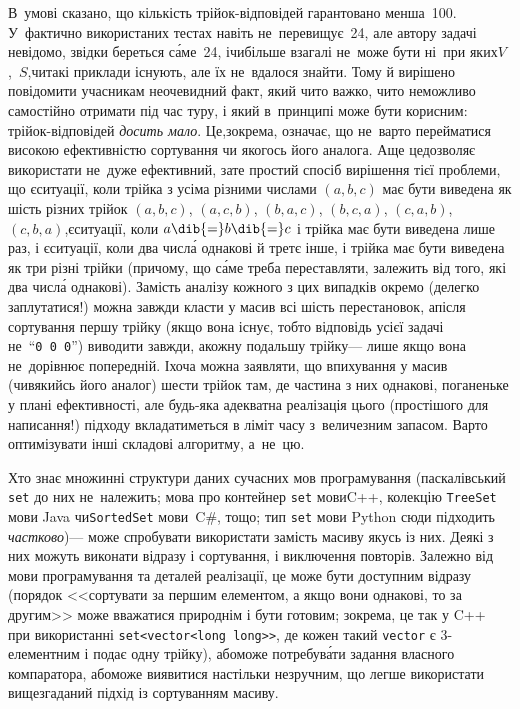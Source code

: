 В~умові сказано, що кількість трійок-відповідей гарантовано менша~100. У~фактично використаних тестах навіть не~перевищує~24, але автору задачі невідомо, звідки береться с\'{а}ме~24, і\nolinebreak[2] чи\nolinebreak[2] більше взагалі не~може бути ні~при яких\nolinebreak[3] $V$,~$S$,\linebreak[2] чи\nolinebreak[3] такі приклади існують, але їх не~вдалося знайти. Тому й вирішено повідомити учасникам неочевидний факт, який чи\nolinebreak[3] то важко, чи\nolinebreak[3] то неможливо самостійно отримати під час туру, і який в~принципі може бути корисним: трійок-відповідей \emph{досить мало}.
Це,\nolinebreak[3] зокрема, означає, що не~варто перейматися високою ефективністю сортування чи якогось його аналога. А\nolinebreak[2] ще це\nolinebreak[2] дозволяє використати не~дуже ефективний, зате простий спосіб вирішення тієї проблеми, що є\nolinebreak[2] ситуації, коли трійка з усіма різними числами $(a,b,c)$ має бути виведена як шість різних трійок $(a,b,c)$,
$(a,c,b)$,
$(b,a,c)$,
$(b,c,a)$,
$(c,a,b)$,
$(c,b,a)$,\linebreak[2] 
є\nolinebreak[2] ситуації, коли $a\dib{{=}}b\dib{{=}}c$ і трійка має бути виведена лише раз,
і є\nolinebreak[2] ситуації, коли два числ\'{а} однакові й третє інше, і трійка має бути виведена як три різні трійки (причому, що с\'{а}ме треба переставляти, залежить від того, які два числ\'{а} однакові). Замість аналізу кожного з цих випадків окремо (де\nolinebreak[3] легко заплутатися!) можна завжди класти у масив всі шість перестановок, а\nolinebreak[3] після сортування першу трійку (якщо вона існує, тобто відповідь усієї задачі не~``\texttt{0~0~0}'') виводити завжди, а\nolinebreak[3] кожну подальшу трійку\nolinebreak[3] --- лише якщо вона не~дорівнює попередній. І\nolinebreak[3] хоча можна заявляти, що впихування у масив (чи\nolinebreak[3] в\nolinebreak[3] якийсь його аналог) шести трійок там, де частина з них однакові, поганеньке у плані ефективності, але будь-яка адекватна реалізація цього (простішого для написання!) підходу вкладатиметься в ліміт часу з~величезним запасом. Варто оптимізувати інші складові алгоритму, а~не~цю.

Хто знає множинні структури даних сучасних мов програмування (паскалівський \texttt{set} до них не~належить; мова про контейнер \texttt{set} мови\nolinebreak[3] C++, колекцію \texttt{TreeSet} мови Java чи\nolinebreak[3] \texttt{SortedSet} мови~C\#, тощо; тип \texttt{set} мови Python сюди підходить \emph{частково})\nolinebreak[3] --- може спробувати використати замість масиву якусь із них. Деякі з них можуть виконати відразу і сортування, і виключення повторів. Залежно від мови програмування та деталей реалізації, це може бути доступним відразу (порядок <<сортувати за першим елементом, а якщо вони однакові, то за другим>> може вважатися природнім і бути готовим; зокрема, це так у C++ при використанні \verb"set<vector<long long>>", де кожен такий \texttt{vector} є \mbox{3-еле}\-мент\-ним і подає одну трійку), або\nolinebreak[2] може потребув\'{а}ти задання власного компаратора, або\nolinebreak[2] може виявитися настільки незручним, що легше використати вищезгаданий підхід із сортуванням масиву.

